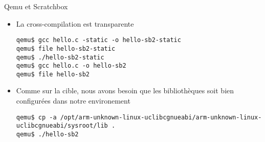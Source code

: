 \begin{frame}[fragile=singleslide]{Qemu et Scratchbox}
  \begin{itemize}
  \item La cross-compilation est transparente
    \begin{lstlisting}
qemu$ gcc hello.c -static -o hello-sb2-static
qemu$ file hello-sb2-static
qemu$ ./hello-sb2-static
qemu$ gcc hello.c -o hello-sb2
qemu$ file hello-sb2
    \end{lstlisting}
  \item Comme  sur la cible,  nous avons besoin que  les bibliothèques
    soit bien configurées dans notre environement
    \begin{lstlisting}
qemu$ cp -a /opt/arm-unknown-linux-uclibcgnueabi/arm-unknown-linux-uclibcgnueabi/sysroot/lib .
qemu$ ./hello-sb2
    \end{lstlisting}
  \end{itemize}
\end{frame}
